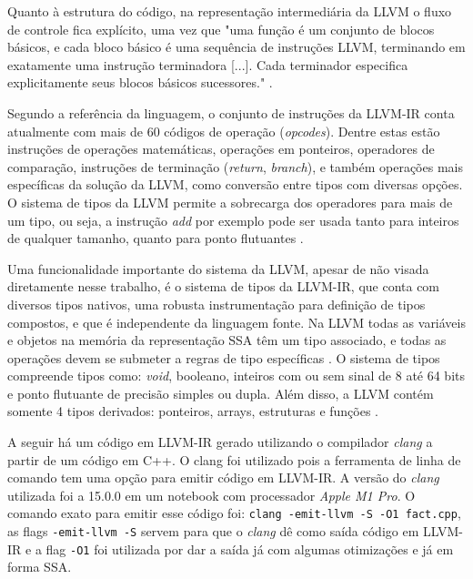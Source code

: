Quanto à estrutura do código, na representação intermediária da LLVM o fluxo de controle fica explícito, uma vez que "uma função é um conjunto de blocos básicos, e cada bloco básico é uma sequência de instruções LLVM, terminando em exatamente uma instrução terminadora [...]. Cada terminador especifica explicitamente seus blocos básicos sucessores." \cite{lattner2004llvm}.

Segundo a referência da linguagem, o conjunto de instruções da LLVM-IR conta atualmente com mais de 60 códigos de operação (\emph{opcodes}). Dentre estas estão instruções de operações matemáticas, operações em ponteiros, operadores de comparação, instruções de terminação (\emph{return}, \emph{branch}), e também operações mais específicas da solução da LLVM, como conversão entre tipos com diversas opções. O sistema de tipos da LLVM permite a sobrecarga dos operadores para mais de um tipo, ou seja, a instrução \emph{add} por exemplo pode ser usada tanto para inteiros de qualquer tamanho, quanto para ponto flutuantes \cite{llvmLangRef}.

Uma funcionalidade importante do sistema da LLVM, apesar de não visada diretamente nesse trabalho, é o sistema de tipos da LLVM-IR, que conta com diversos tipos nativos, uma robusta instrumentação para definição de tipos compostos, e que é independente da linguagem fonte. Na LLVM todas as variáveis e objetos na memória da representação SSA têm um tipo associado, e todas as operações devem se submeter a regras de tipo específicas \cite{lattner2004llvm}. O sistema de tipos compreende tipos como: \emph{void}, booleano, inteiros com ou sem sinal de 8 até 64 bits e ponto flutuante de precisão simples ou dupla. Além disso, a LLVM contém somente 4 tipos derivados: ponteiros, arrays, estruturas e funções \cite{llvmLangRef}.

A seguir há um código em LLVM-IR gerado utilizando o compilador \emph{clang} a partir de um código em C++. O clang foi utilizado pois a ferramenta de linha de comando tem uma opção para emitir código em LLVM-IR. A versão do \emph{clang} utilizada foi a 15.0.0 em um notebook com processador \emph{Apple M1 Pro}. O comando exato para emitir esse código foi: \verb|clang -emit-llvm -S -O1 fact.cpp|, as flags \verb|-emit-llvm -S| servem para que o \emph{clang} dê como saída código em LLVM-IR e a flag \verb|-O1| foi utilizada por dar a saída já com algumas otimizações e já em forma SSA.


